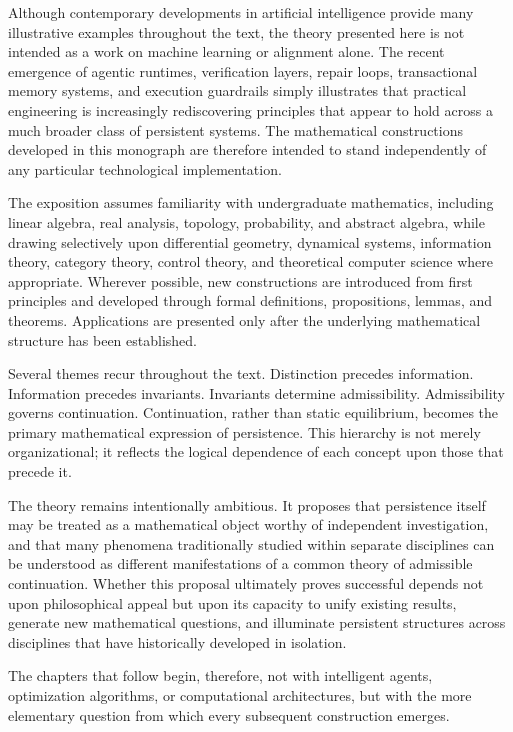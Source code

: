 \documentclass[11pt]{book}
\numberwithin{equation}{chapter}
\theoremstyle{definition}
\theoremstyle{plain}
\begin{document}
Although contemporary developments in artificial intelligence provide many illustrative examples throughout the text, the theory presented here is not intended as a work on machine learning or alignment alone. The recent emergence of agentic runtimes, verification layers, repair loops, transactional memory systems, and execution guardrails simply illustrates that practical engineering is increasingly rediscovering principles that appear to hold across a much broader class of persistent systems. The mathematical constructions developed in this monograph are therefore intended to stand independently of any particular technological implementation.

The exposition assumes familiarity with undergraduate mathematics, including linear algebra, real analysis, topology, probability, and abstract algebra, while drawing selectively upon differential geometry, dynamical systems, information theory, category theory, control theory, and theoretical computer science where appropriate. Wherever possible, new constructions are introduced from first principles and developed through formal definitions, propositions, lemmas, and theorems. Applications are presented only after the underlying mathematical structure has been established.

Several themes recur throughout the text. Distinction precedes information. Information precedes invariants. Invariants determine admissibility. Admissibility governs continuation. Continuation, rather than static equilibrium, becomes the primary mathematical expression of persistence. This hierarchy is not merely organizational; it reflects the logical dependence of each concept upon those that precede it.

The theory remains intentionally ambitious. It proposes that persistence itself may be treated as a mathematical object worthy of independent investigation, and that many phenomena traditionally studied within separate disciplines can be understood as different manifestations of a common theory of admissible continuation. Whether this proposal ultimately proves successful depends not upon philosophical appeal but upon its capacity to unify existing results, generate new mathematical questions, and illuminate persistent structures across disciplines that have historically developed in isolation.

The chapters that follow begin, therefore, not with intelligent agents, optimization algorithms, or computational architectures, but with the more elementary question from which every subsequent construction emerges.
\end{document}
